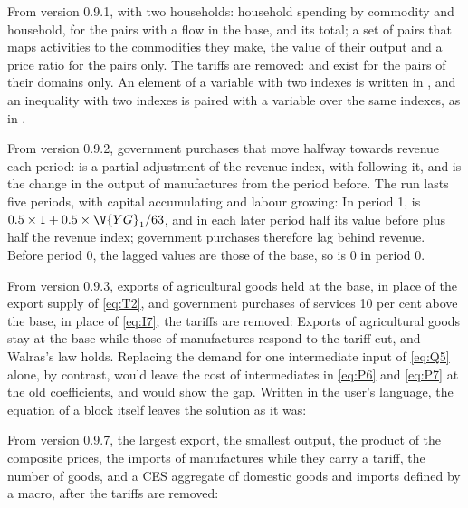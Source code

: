 
From version 0.9.1, with two households: household spending by commodity and
household, for the pairs with a flow in the base, and its total; a set of
pairs that maps activities to the commodities they make, the value of their
output and a price ratio for the pairs only. The tariffs are removed:
 and  exist for the pairs of their domains only. An element of
a variable with two indexes is written  in , and
an inequality with two indexes is paired with a variable over the same
indexes, as in .


From version 0.9.2, government purchases that move halfway towards revenue
each period:  is a partial adjustment of the revenue index, with
 following it, and  is the change in the output of
manufactures from the period before. The run lasts five periods, with capital
accumulating and labour growing:
In period 1,  is $0.5 \times 1 + 0.5 \times \V{YG}_1 / 63$, and in each
later period half its value before plus half the revenue index; government
purchases therefore lag behind revenue. Before period 0, the lagged values are
those of the base, so  is 0 in period 0.


From version 0.9.3, exports of agricultural goods held at the base, in place
of the export supply of \eqref{eq:T2}, and government purchases of services 10
per cent above the base, in place of \eqref{eq:I7}; the tariffs are removed:
Exports of agricultural goods stay at the base while those of manufactures
respond to the tariff cut, and Walras's law holds. Replacing the demand for
one intermediate input of \eqref{eq:Q5} alone, by contrast, would leave the cost
of intermediates in \eqref{eq:P6} and \eqref{eq:P7} at the old coefficients, and
 would show the gap. Written in the user's language, the equation of
a block itself leaves the solution as it was:


From version 0.9.7, the largest export, the smallest output, the product of
the composite prices, the imports of manufactures while they carry a tariff,
the number of goods, and a CES aggregate of domestic goods and imports defined
by a macro, after the tariffs are removed:

